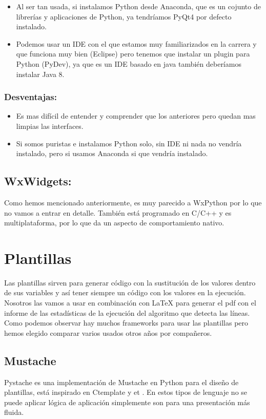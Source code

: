 \begin{itemize}
\item Al ser tan usada, si instalamos Python desde Anaconda, que es un cojunto de librerías y aplicaciones de Python, ya tendríamos PyQt4 por defecto instalado.

\item Podemos usar un IDE con el que estamos muy familiarizados en la carrera y que funciona muy bien (Eclipse) pero tenemos que instalar un plugin para Python (PyDev), ya que es un IDE basado en java también deberíamos instalar Java 8.
\end{itemize}

\subsubsection{Desventajas:}

\begin{itemize}
\item Es mas difícil de entender y comprender que los anteriores pero quedan mas limpias las interfaces.
\item Si somos puristas e instalamos Python solo, sin IDE ni nada no vendría instalado, pero si usamos Anaconda si que vendría instalado.
\end{itemize}

\subsection{WxWidgets:}
Como hemos mencionado anteriormente, es muy parecido a WxPython por lo que no vamos a entrar en detalle. También está programado en C/C++ y es multiplataforma, por lo que da un aspecto de comportamiento nativo.



\section{Plantillas}
Las plantillas sirven para generar código con la sustitución de los valores dentro de sus variables y así tener siempre un código con los valores en la ejecución.\\
Nosotros las vamos a usar en combinación con LaTeX para generar el pdf con el informe de las estadísticas de la ejecución del algoritmo que detecta las líneas.\\
Como podemos observar hay muchos frameworks para usar las plantillas pero hemos elegido comparar varios usados otros años por compañeros.
\subsection{Mustache}
Pystache es una implementación de Mustache en Python para el diseño de plantillas, está inspirado en Ctemplate \cite{GitHub:CTemplate} y et \cite{et}.
En estos tipos de lenguaje no se puede aplicar lógica de aplicación simplemente son para una presentación más fluida.

